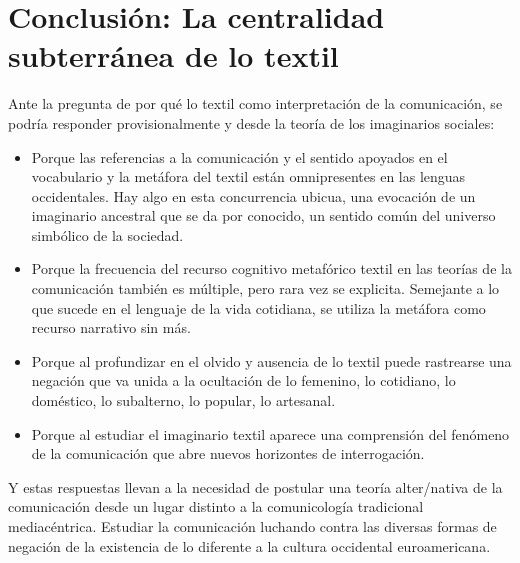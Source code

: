 \documentclass{tufte-handout}
\begin{document}
\hypertarget{conclusin-la-centralidad-subterrnea-de-lo-textil}{%
\section{Conclusión: La centralidad subterránea de lo
textil}\label{conclusin-la-centralidad-subterrnea-de-lo-textil}}

Ante la pregunta de por qué lo textil como interpretación de la
comunicación, se podría responder provisionalmente y desde la teoría de
los imaginarios sociales:

\begin{itemize}
\item
  Porque las referencias a la comunicación y el sentido apoyados en el
  vocabulario y la metáfora del textil están omnipresentes en las
  lenguas occidentales. Hay algo en esta concurrencia ubicua, una
  evocación de un imaginario ancestral que se da por conocido, un
  sentido común del universo simbólico de la sociedad.
\item
  Porque la frecuencia del recurso cognitivo metafórico textil en las
  teorías de la comunicación también es múltiple, pero rara vez se
  explicita. Semejante a lo que sucede en el lenguaje de la vida
  cotidiana, se utiliza la metáfora como recurso narrativo sin más.
\item
  Porque al profundizar en el olvido y ausencia de lo textil puede
  rastrearse una negación que va unida a la ocultación de lo femenino,
  lo cotidiano, lo doméstico, lo subalterno, lo popular, lo artesanal.
\item
  Porque al estudiar el imaginario textil aparece una comprensión del
  fenómeno de la comunicación que abre nuevos horizontes de
  interrogación.
\end{itemize}

Y estas respuestas llevan a la necesidad de postular una teoría
alter/nativa de la comunicación desde un lugar distinto a la
comunicología tradicional mediacéntrica. Estudiar la comunicación
luchando contra las diversas formas de negación de la existencia de lo
diferente a la cultura occidental euroamericana.
\end{document}
